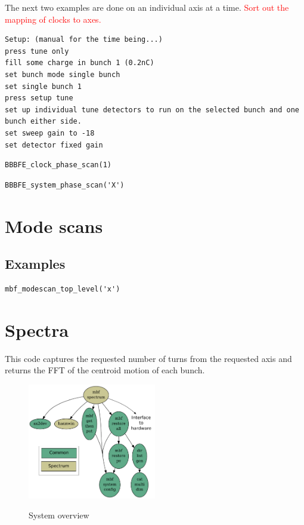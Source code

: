 \documentclass{report}
\begin{document}
The next two examples are done on an individual axis at a time. \textcolor{red}{Sort out the mapping of clocks to axes.}
\begin{verbatim}
Setup: (manual for the time being...)
press tune only
fill some charge in bunch 1 (0.2nC)
set bunch mode single bunch
set single bunch 1
press setup tune
set up individual tune detectors to run on the selected bunch and one bunch either side.
set sweep gain to -18
set detector fixed gain
\end{verbatim}
\begin{verbatim}
BBBFE_clock_phase_scan(1)
\end{verbatim}
\begin{verbatim}
BBBFE_system_phase_scan('X')
\end{verbatim}
\chapter{Mode scans}


\section{Examples}

\begin{verbatim}
mbf_modescan_top_level('x')
\end{verbatim}


\chapter{Spectra}
This code captures the requested number of turns from the requested axis and returns the FFT of the centroid motion of each bunch.

\begin{figure}[hbt]
\begin{center}
  \includegraphics[width=0.5\textwidth]{mbf_spectrum.pdf}\\
  \caption{System overview}\label{fig:code_tree_spectrum}
\end{center}
\end{figure}
\end{document}

